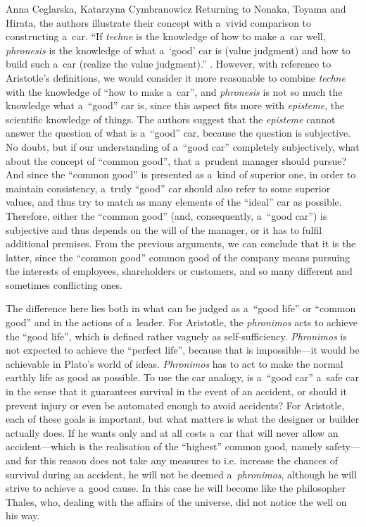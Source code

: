 \begin{artengenv2auth}{Anna Ceglarska, Katarzyna Cymbranowicz}
Returning to Nonaka, Toyama and Hirata, the authors illustrate their concept with a~vivid comparison to constructing a~car. ``If \textit{techne} is the knowledge of how to make a~car well, \textit{phronesis} is the knowledge of what a~‘good' car is (value judgment) and how to build such a~car (realize the value judgment).'' 
\parencite[][p.54]{nonaka_managing_2008}. %
 However, with reference to Aristotle's definitions, we would consider it more reasonable to combine \textit{techne} with the knowledge of ``how to make a~car'', and \textit{phronesis} is not so much the knowledge what a~``good'' car is, since this aspect fits more with \textit{episteme}, the scientific knowledge of things. The authors suggest that the \textit{episteme} cannot answer the question of what is a~``good'' car, because the question is subjective. No doubt, but if our understanding of a~``good car'' completely subjectively, what about the concept of ``common good'', that a~prudent manager should pursue? And since the ``common good'' is presented as a~kind of superior one, in order to maintain consistency, a~truly ``good'' car should also refer to some superior values, and thus try to match as many elements of the ``ideal'' car as possible. Therefore, either the ``common good'' (and, consequently, a~``good car'') is subjective and thus depends on the will of the manager, or it has to fulfil additional premises. From the previous arguments, we can conclude that it is the latter, since the ``common good'' common good of the company means pursuing the interests of employees, shareholders or customers, and so many different and sometimes conflicting ones.



The difference here lies both in what can be judged as a~``good life'' or ``common good'' and in the actions of a~leader. For Aristotle, the \textit{phronimos} acts to achieve the ``good life'', which is defined rather vaguely as self-sufficiency. \textit{Phronimos} is not expected to achieve the ``perfect life'', because that is impossible---it would be achievable in Plato's world of ideas. \textit{Phronimos} has to act to make the normal earthly life as good as possible. To use the car analogy, is a~``good car'' a~safe car in the sense that it guarantees survival in the event of an accident, or should it prevent injury or even be automated enough to avoid accidents? For Aristotle, each of these goals is important, but what matters is what the designer or builder actually does. If he wants only and at all costs a~car that will never allow an accident---which is the realisation of the ``highest'' common good, namely safety---and for this reason does not take any measures to i.e. increase the chances of survival during an accident, he will not be deemed a~\textit{phronimos}, although he will strive to achieve a~good cause. In this case he will become like the philosopher Thales, who, dealing with the affairs of the universe, did not notice the well on his way.




\end{artengenv2auth}
